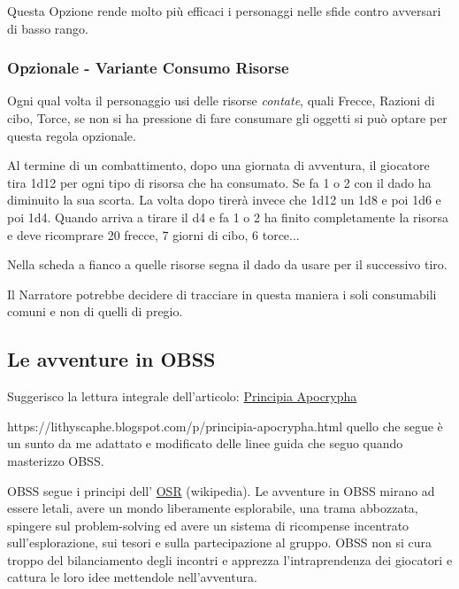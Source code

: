 \begin{multicols}{2}
Questa Opzione rende molto più efficaci i personaggi nelle sfide contro avversari di basso rango.

\subsubsection{Opzionale - Variante Consumo Risorse}\label{varianteconsumorisorse}\hypertarget{varianteconsumorisorse}{}

Ogni qual volta il personaggio usi delle risorse \emph{contate}, quali Frecce, Razioni di cibo, Torce, se non si ha pressione di fare consumare gli oggetti si può optare per questa regola opzionale.

Al termine di un combattimento, dopo una giornata di avventura, il giocatore tira 1d12 per ogni tipo di risorsa che ha consumato. Se fa 1 o 2 con il dado ha diminuito la sua scorta.
La volta dopo tirerà invece che 1d12 un 1d8 e poi 1d6 e poi 1d4. Quando arriva a tirare il d4 e fa 1 o 2 ha finito completamente la risorsa e deve ricomprare 20 frecce, 7 giorni di cibo, 6 torce...

Nella scheda a fianco a quelle risorse segna il dado da usare per il successivo tiro.

Il Narratore potrebbe decidere di tracciare in questa maniera i soli consumabili comuni e non di quelli di pregio.

\subsection{Le avventure in OBSS} \hypertarget{OSR}{} \label{avventureinobss}

Suggerisco la lettura integrale dell'articolo: \href{https://lithyscaphe.blogspot.com/p/principia-apocrypha.html} {Principia Apocrypha}

https://lithyscaphe.blogspot.com/p/principia-apocrypha.html quello che segue è un sunto da me adattato e modificato delle linee guida che seguo quando masterizzo OBSS.

OBSS segue i principi dell' \href{https://it.wikipedia.org/wiki/Old_School_Renaissance}{OSR} (wikipedia). Le avventure in OBSS mirano ad essere letali, avere un mondo liberamente esplorabile, una trama abbozzata, spingere sul problem-solving ed avere un sistema di ricompense incentrato sull'esplorazione, sui tesori e sulla partecipazione al gruppo. OBSS non si cura troppo del bilanciamento degli incontri e apprezza l'intraprendenza dei giocatori e cattura le loro idee mettendole nell'avventura.


\end{multicols}
